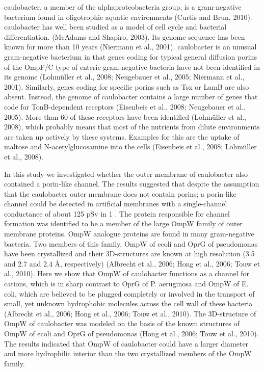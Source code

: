     \ac{caulobacter}, a member of the alphaproteobacteria group, is a gram-negative bacterium found in oligotrophic aquatic environments (Curtis and Brun, 2010). \ac{caulobacter} has well been studied as a model of cell cycle and bacterial differentiation. (McAdams and Shapiro, 2003). Its genome sequence has been known for more than 10 years (Niermann et al., 2001). \ac{caulobacter} is an unusual gram-negative bacterium in that genes coding for typical general diffusion porins of the OmpF/C type of enteric gram-negative bacteria have not been identified in its genome (Lohmüller et al., 2008; Neugebauer et al., 2005; Niermann et al., 2001). Similarly, genes coding for specific porins such as Tsx or LamB are also absent. Instead, the genome of \ac{caulobacter} contains a large number of genes that code for TonB-dependent receptors (Eisenbeis et al., 2008; Neugebauer et al., 2005). More than 60 of these receptors have been identified (Lohmüller et al., 2008), which probably means that most of the nutrients from dilute environments are taken up actively by these systems. Examples for this are the uptake of maltose and N-acetylglucosamine into the cells (Eisenbeis et al., 2008; Lohmüller et al., 2008). 

    In this study we investigated whether the outer membrane of \ac{caulobacter} also contained a porin-like channel. The results suggested that despite the assumption that the \ac{caulobacter} outer membrane does not contain porins; a porin-like channel could be detected in artificial membranes with a single-channel conductance of about 125 \si{\pico\sievert} in 1 \si{\molar} . The protein responsible for channel formation was identified to be a member of the large OmpW family of outer membrane proteins. OmpW analogue proteins are found in many gram-negative bacteria. Two members of this family, OmpW of \ac{ecoli} and OprG of \ac{pseudomonas} have been crystallized and their 3D-structures are known at high resolution (3.5 and 2.7 and 2.4 \AA, respectively) (Albrecht et al., 2006; Hong et al., 2006; Touw et al., 2010). Here we show that OmpW of \ac{caulobacter} functions as a channel for cations, which is in sharp contrast to OprG of P. aeruginosa and OmpW of E. coli, which are believed to be plugged completely or involved in the transport of small, yet unknown hydrophobic molecules across the cell wall of these bacteria (Albrecht et al., 2006; Hong et al., 2006; Touw et al., 2010). The 3D-structure of OmpW of \ac{caulobacter} was modeled on the basis of the known structures of OmpW of \ac{ecoli} and OprG of \ac{pseudomonas} (Hong et al., 2006; Touw et al., 2010). The results indicated that OmpW of \ac{caulobacter} could have a larger diameter and more hydrophilic interior than the two crystallized members of the OmpW family.

